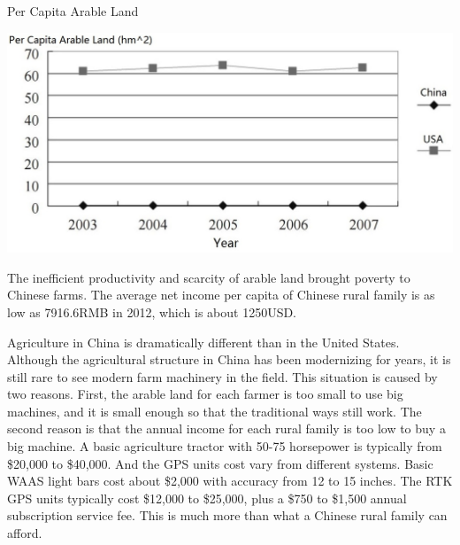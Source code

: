 \begin{table}[ht!]
\begin{center}
\caption{Per Capita Arable Land}
\includegraphics[scale = 0.4]{pics/capitahm2.jpg}
\end{center}
\end{table}
The inefficient productivity and scarcity of arable land brought poverty to Chinese farms. The average net income per capita of Chinese rural family is as low as 7916.6RMB in 2012, which is about 1250USD. \cite{income2012} 

Agriculture in China is dramatically different than in the United States. Although the agricultural structure in China has been modernizing for years, it is still rare to see  modern farm machinery in the field. This situation is caused by two reasons. First, the arable land for each farmer is too small to use big machines, and it is small enough so that the traditional ways still work. The second reason is that the annual income for each rural family is too low to buy a big machine. A basic agriculture tractor with 50-75 horsepower is typically from \$20,000 to \$40,000.\cite{tractorcost} And the GPS units cost vary from different systems. Basic WAAS light bars cost about \$2,000 with accuracy from 12 to 15 inches. The RTK GPS units typically cost \$12,000 to \$25,000, plus a \$750 to \$1,500 annual subscription service fee.\cite{PriceR} This is much more than what a Chinese rural family can afford. 



